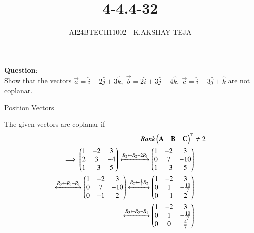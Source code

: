 \documentclass[journal]{IEEEtran}
\begin{document}

\vspace{3cm}

\title{4-4.4-32}
\author{AI24BTECH11002 - K.AKSHAY TEJA}
{\let\newpage\relax\maketitle}

\renewcommand{\thefigure}{\theenumi}
\renewcommand{\thetable}{\theenumi}
\setlength{\intextsep}{10pt} %


\renewcommand{\thetable}{\theenumi}


\textbf{Question}:\\
Show that the vectors \(\vec{a} = \hat{i} - 2 \hat{j} + 3 \hat{k}, \; 
\vec{b} = 2 \hat{i} + 3 \hat{j} - 4 \hat{k}, \;\vec{c} = \hat{i} - 3 \hat{j} + \hat{k}\) are not coplanar.\\

\solution

\begin{table}[h!]
	\centering
	
	\caption{Position Vectors}
	\label{tab:4-4.4-32}
\end{table}

The given vectors are coplanar if 
\begin{align}
	Rank\begin{pmatrix}\mathbf{A} & \mathbf{B} & \mathbf{C}\end{pmatrix}^\top &\neq 2\\
	\implies \begin{pmatrix}1 &-2 & 3\\ 2 &3 &-4\\1 &-3 &5\end{pmatrix} \xleftrightarrow[]{R_2 \leftarrow R_2 - 2R_1} \begin{pmatrix}1 &-2& 3\\0& 7& -10\\1 &-3 &5\end{pmatrix}\\
 \xleftrightarrow[]{R_3 \leftarrow R_3 - R_1 } \begin{pmatrix}1 &-2& 3\\0& 7 &-10\\0& -1 &2\end{pmatrix}
	\xleftrightarrow[]{R_2 \leftarrow \frac{1}{7}R_2} \begin{pmatrix}1 &-2& 3\\0& 1& -\frac{10}{7}\\0 &-1& 2\end{pmatrix}\\\xleftrightarrow[]{R_3 \leftarrow R_3-R_1}\begin{pmatrix}1&-2& 3 \\0& 1 &-\frac{10}{7}\\0& 0& \frac{4}{7} \end{pmatrix}
\end{align}
\end{document}

